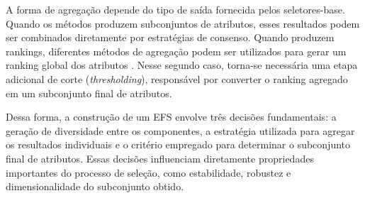 A forma de agregação depende do tipo de saída fornecida pelos
seletores-base. Quando os métodos produzem subconjuntos de atributos,
esses resultados podem ser combinados diretamente por estratégias de
consenso. Quando produzem rankings, diferentes métodos de agregação
podem ser utilizados para gerar um ranking global dos atributos
\cite{bolon2019ensembles}. Nesse segundo caso, torna-se necessária uma
etapa adicional de corte (\textit{thresholding}), responsável por
converter o ranking agregado em um subconjunto final de atributos.

Dessa forma, a construção de um EFS envolve três decisões fundamentais:
a geração de diversidade entre os componentes, a estratégia utilizada
para agregar os resultados individuais e o critério empregado para
determinar o subconjunto final de atributos. Essas decisões influenciam
diretamente propriedades importantes do processo de seleção, como
estabilidade, robustez e dimensionalidade do subconjunto obtido.
